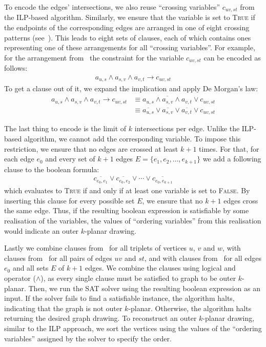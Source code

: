 To encode the edges' intersections, we also reuse ``crossing variables'' \(c_{uv, st}\) from the ILP-based algorithm. Similarly, we ensure that the variable is set to \textsc{True} if the endpoints of the corresponding edges are arranged in one of eight crossing patterns (see~). This leads to eight sets of clauses, each of which contains ones representing one of these arrangements for all ``crossing variables''. For example, for the arrangement from~ the constraint for the variable \(c_{uv, st}\) can be encoded as follows:
\begin{align*}
    a_{u,s} \land a_{s,v} \land a_{v,t} \rightarrow c_{uv, st}
\end{align*}
To get a clause out of it, we expand the implication and apply De Morgan's law:
\begin{align}
    a_{u,s} \land a_{s,v} \land a_{v,t} \rightarrow c_{uv, st}
    & \equiv \overline{a_{u,s} \land a_{s,v} \land a_{v,t}} \lor c_{uv, st} \nonumber \\
    & \equiv \overline{a_{u,s}} \lor \overline{a_{s,v}} \lor \overline{a_{v,t}} \lor c_{uv, st} \label{sat:crossing-vars}
\end{align}

The last thing to encode is the limit of \(k\) intersections per edge. Unlike the ILP-based algorithm, we cannot add the corresponding variable. To impose this restriction, we ensure that no edges are crossed at least \(k+1\) times. For that, for each edge \(e_0\) and every set of \(k+1\) edges \(E = \{e_1, e_2, \dots, e_{k+1}\}\) we add a following clause to the boolean formula:
\begin{align}
    \overline{c_{e_0, e_1}} \lor \overline{c_{e_0, e_2}} \lor \cdots \lor \overline{c_{e_0, e_{k+1}}} \label{sat:cr-limit}
\end{align}
which evaluates to \textsc{True} if and only if at least one variable is set to \textsc{False}. By inserting this clause for every possible set \(E\), we ensure that no \(k+1\) edges cross the same edge. Thus, if the resulting boolean expression is satisfiable by some realisation of the variables, the values of ``ordering variables'' from this realisation would indicate an outer \(k\)-planar drawing.

Lastly we combine clauses from~ for all triplets of vertices \(u\), \(v\) and \(w\), with clauses from~ for all pairs of edges \(uv\) and \(st\), and with clauses from~ for all edges \(e_0\) and all sets \(E\) of \(k+1\) edges. We combine the clauses using logical and operator (\(\land\)), as every single clause must be satisfied to graph to be outer \(k\)-planar. Then, we run the SAT solver using the resulting boolean expression as an input. If the solver fails to find a satisfiable instance, the algorithm halts, indicating that the graph is not outer \(k\)-planar. Otherwise, the algorithm halts returning the desired graph drawing. To reconstruct an outer \(k\)-planar drawing, similar to the ILP approach, we sort the vertices using the values of the ``ordering variables'' assigned by the solver to specify the order.

